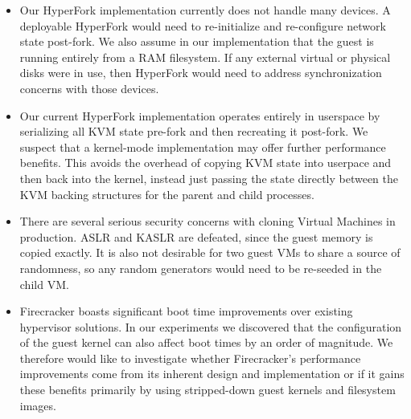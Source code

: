 \begin{itemize}
  \item Our HyperFork implementation currently does not handle many devices. A deployable HyperFork would need to re-initialize and re-configure network state post-fork. We also assume in our implementation that the guest is running entirely from a RAM filesystem. If any external virtual or physical disks were in use, then HyperFork would need to address synchronization concerns with those devices.
  \item Our current HyperFork implementation operates entirely in userspace by serializing all KVM state pre-fork and then recreating it post-fork. We suspect that a kernel-mode implementation may offer further performance benefits. This avoids the overhead of copying KVM state into userpace and then back into the kernel, instead just passing the state directly between the KVM backing structures for the parent and child processes.
  \item There are several serious security concerns with cloning Virtual Machines in production. ASLR and KASLR are defeated, since the guest memory is copied exactly. It is also not desirable for two guest VMs to share a source of randomness, so any random generators would need to be re-seeded in the child VM.
  \item Firecracker boasts significant boot time improvements over existing hypervisor solutions. In our experiments we discovered that the configuration of the guest kernel can also affect boot times by an order of magnitude. We therefore would like to investigate whether Firecracker's performance improvements come from its inherent design and implementation or if it gains these benefits primarily by using stripped-down guest kernels and filesystem images.
\end{itemize}

